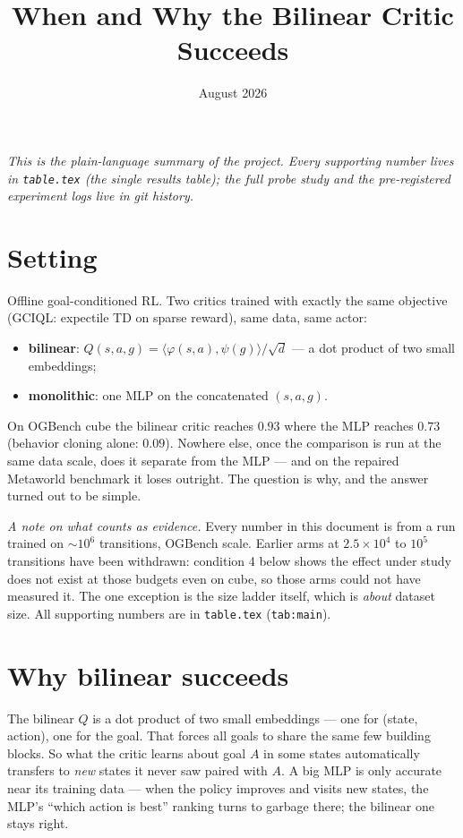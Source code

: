 \documentclass[10pt]{article}
\title{\vspace{-2em}When and Why the Bilinear Critic Succeeds}
\author{}
\date{August 2026}
\begin{document}
\maketitle
\vspace{-2em}

\noindent\emph{This is the plain-language summary of the project. Every supporting number
lives in \texttt{table.tex} (the single results table); the full probe study and the
pre-registered experiment logs live in git history.}

\section{Setting}

Offline goal-conditioned RL. Two critics trained with exactly the same objective
(GCIQL: expectile TD on sparse reward), same data, same actor:
\begin{itemize}
\item \textbf{bilinear}: $Q(s,a,g) = \langle \varphi(s,a), \psi(g)\rangle / \sqrt d$ ---
a dot product of two small embeddings;
\item \textbf{monolithic}: one MLP on the concatenated $(s,a,g)$.
\end{itemize}
On OGBench cube the bilinear critic reaches $0.93$ where the MLP reaches $0.73$
(behavior cloning alone: $0.09$). Nowhere else, once the comparison is run at the same
data scale, does it separate from the MLP --- and on the repaired Metaworld benchmark it
loses outright. The question is why, and the answer turned out to be simple.

\emph{A note on what counts as evidence.} Every number in this document is from a run
trained on ${\sim}10^6$ transitions, OGBench scale. Earlier arms at $2.5\times10^4$ to
$10^5$ transitions have been withdrawn: condition 4 below shows the effect under study
does not exist at those budgets even on cube, so those arms could not have measured it.
The one exception is the size ladder itself, which is \emph{about} dataset size. All
supporting numbers are in \texttt{table.tex} (\texttt{tab:main}).

\section{Why bilinear succeeds}

The bilinear $Q$ is a dot product of two small embeddings --- one for (state, action),
one for the goal. That forces all goals to share the same few building blocks. So what
the critic learns about goal $A$ in some states automatically transfers to \emph{new}
states it never saw paired with $A$. A big MLP is only accurate near its training data
--- when the policy improves and visits new states, the MLP's ``which action is best''
ranking turns to garbage there; the bilinear one stays right.
\end{document}

